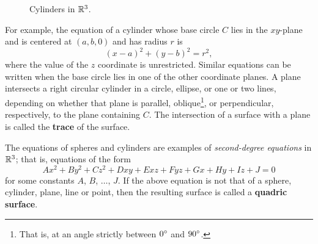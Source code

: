 \begin{figure}[h]
{\begin{tikzpicture}
 \end{tikzpicture}}
 \qquad\qquad
 \caption[]{\quad Cylinders in $\Real{3}$.}
 \label{fig:cyls}
\end{figure}

For example, the equation of a cylinder whose base circle $C$ lies in the $xy$-plane and is centered at $(a,b,0)$ and
has radius $r$ is
\begin{equation}\label{eqn:cylxy}
 (x - a)^2 + (y - b)^2 = r^2,
\end{equation}
where the value of the $z$ coordinate is unrestricted. Similar equations can be written when the base circle
lies in one of the other coordinate planes.
A plane intersects a right circular cylinder in a circle, ellipse, or one or two lines,
depending on whether that plane is parallel, oblique\footnote{That is, at an angle strictly between $0\Degrees$ and
$90\Degrees$.}, or perpendicular, respectively, to the plane containing $C$.
The intersection of a surface with a plane is called the \textbf{trace} of the surface.

The equations of spheres and cylinders are examples of \emph{second-degree equations} in $\Real{3}$; 
that is, equations of the form
\begin{equation}\label{eqn:quadric}
 Ax^2 + By^2 + Cz^2 + Dxy + Exz + Fyz + Gx + Hy + Iz + J = 0
\end{equation}
for some constants $A$, $B$, $\dots$, $J$. If the above equation is
not that of a sphere, cylinder, plane, line or point, then the resulting surface is called a
\textbf{quadric surface}.

